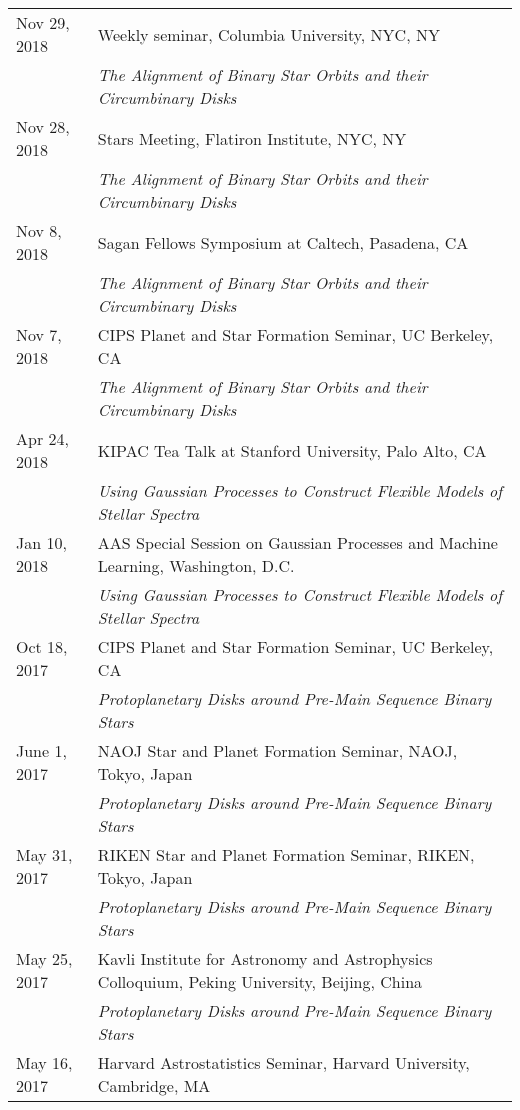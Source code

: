 \begin{longtable}{@{\hspace{10pt}}p{1.2in}l}
  Nov 29, 2018 & Weekly seminar, Columbia University, NYC, NY \\
  & \emph{The Alignment of Binary Star Orbits and their Circumbinary Disks} \\[\rowskip]
  Nov 28, 2018 & Stars Meeting, Flatiron Institute, NYC, NY \\
  & \emph{The Alignment of Binary Star Orbits and their Circumbinary Disks} \\[\rowskip]
  Nov 8, 2018 & Sagan Fellows Symposium at Caltech, Pasadena, CA \\
  & \emph{The Alignment of Binary Star Orbits and their Circumbinary Disks} \\[\rowskip]
  Nov 7, 2018 & CIPS Planet and Star Formation Seminar, UC Berkeley, CA  \\
  & \emph{The Alignment of Binary Star Orbits and their Circumbinary Disks} \\[\rowskip]
  Apr 24, 2018 & KIPAC Tea Talk at Stanford University, Palo Alto, CA \\
  & \emph{Using Gaussian Processes to Construct Flexible Models of Stellar Spectra} \\[\rowskip]
  Jan 10, 2018 & AAS Special Session on Gaussian Processes and Machine Learning, Washington, D.C. \\
  & \emph{Using Gaussian Processes to Construct Flexible Models of Stellar Spectra}\\[\rowskip]
  Oct 18, 2017 & CIPS Planet and Star Formation Seminar, UC Berkeley, CA \\
  & \emph{Protoplanetary Disks around Pre-Main Sequence Binary Stars} \\[\rowskip]
  June 1, 2017 & NAOJ Star and Planet Formation Seminar, NAOJ, Tokyo, Japan \\
  & \emph{Protoplanetary Disks around Pre-Main Sequence Binary Stars} \\[\rowskip]
  May 31, 2017 & RIKEN Star and Planet Formation Seminar, RIKEN, Tokyo, Japan \\
  & \emph{Protoplanetary Disks around Pre-Main Sequence Binary Stars} \\[\rowskip]
  May 25, 2017 & Kavli Institute for Astronomy and Astrophysics Colloquium, Peking University, Beijing, China \\
  & \emph{Protoplanetary Disks around Pre-Main Sequence Binary Stars} \\[\rowskip]
  May 16, 2017 & Harvard Astrostatistics Seminar, Harvard University, Cambridge, MA \\

\end{longtable}
